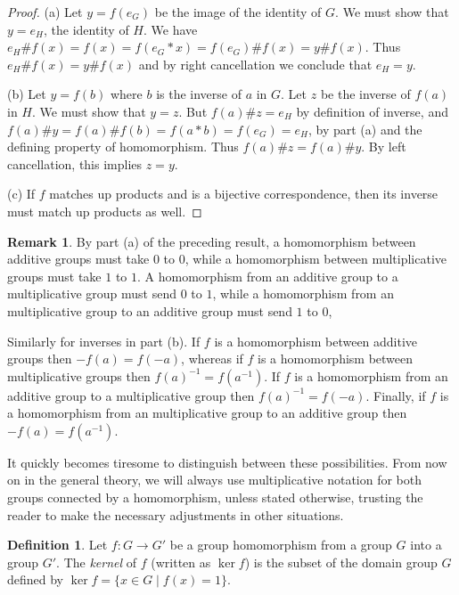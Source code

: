 \documentclass[11pt]{article}
\theoremstyle{definition}
\newtheorem{defn}[thm]{Definition}
\newtheorem{rmk}[thm]{Remark}
\begin{document}
\begin{proof}
(a) Let $y = f(e_G)$ be the image of the identity of $G$. We must show
that $y=e_H$, the identity of $H$. We have $e_H\#f(x) = f(x) =
f(e_G*x) = f(e_G)\#f(x) = y\#f(x)$. Thus $e_H\# f(x) = y \#f(x)$ and
by right cancellation we conclude that $e_H = y$.

(b) Let $y = f(b)$ where $b$ is the inverse of $a$ in $G$. Let $z$ be
the inverse of $f(a)$ in $H$. We must show that $y=z$. But $f(a)\#z =
e_H$ by definition of inverse, and $f(a)\#y = f(a)\#f(b) = f(a*b) =
f(e_G) = e_H$, by part (a) and the defining property of
homomorphism. Thus $f(a)\#z = f(a)\#y$. By left cancellation, this
implies $z=y$.

(c) If $f$ matches up products and is a bijective correspondence, then
its inverse must match up products as well.
\end{proof}



\begin{rmk}
By part (a) of the preceding result, a homomorphism between additive
groups must take $0$ to $0$, while a homomorphism between
multiplicative groups must take $1$ to $1$. A homomorphism from an
additive group to a multiplicative group must send $0$ to $1$, while a
homomorphism from an multiplicative group to an additive group must
send $1$ to $0$,

Similarly for inverses in part (b). If $f$ is a homomorphism between
additive groups then $-f(a) = f(-a)$, whereas if $f$ is a homomorphism
between multiplicative groups then $f(a)^{-1} = f(a^{-1})$. If $f$ is
a homomorphism from an additive group to a multiplicative group then
$f(a)^{-1} = f(-a)$. Finally, if $f$ is a homomorphism from an
multiplicative group to an additive group then $-f(a) = f(a^{-1})$.
\end{rmk}


It quickly becomes tiresome to distinguish between these
possibilities. From now on in the general theory, we will always use
multiplicative notation for both groups connected by a homomorphism,
unless stated otherwise, trusting the reader to make the necessary
adjustments in other situations.


\begin{defn}
  Let $f: G \to G'$ be a group homomorphism from a group $G$ into a
  group $G'$. The \emph{kernel} of $f$ (written as $\ker f$) is the
  subset of the domain group $G$ defined by $\ker f = \{x \in G \mid
  f(x) = 1 \}$. 
\end{defn}
\end{document}
